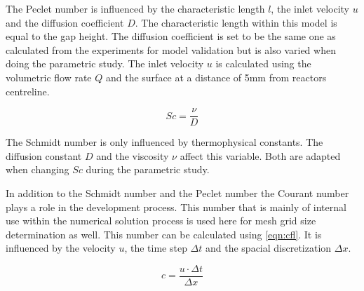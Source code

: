 \documentclass[../thesis.tex]{subfiles}
\begin{document}
The Peclet number is influenced by the characteristic length $l$, the inlet velocity $u$ and the diffusion coefficient $D$. The characteristic length within this model is equal to the gap height. The diffusion coefficient is set to be the same one as calculated from the experiments for model validation but is also varied when doing the parametric study. The inlet velocity $u$ is calculated using the volumetric flow rate $Q$ and the surface at a distance of 5mm from reactors centreline. 

\begin{equation}
	\label{eqn: Sc}
	Sc = \dfrac{\nu}{D}
\end{equation}

The Schmidt number is only influenced by thermophysical constants. The diffusion constant $D$ and the viscosity $\nu$ affect this variable. Both are adapted when changing $Sc$ during the parametric study.

In addition to the Schmidt number and the Peclet number the Courant number plays a role in the development process. This number that is mainly of internal use within the numerical solution process is used here for mesh grid size determination as well. This number can be calculated using \autoref{eqn:cfl}. It is influenced by the velocity $u$, the time step $ \Delta t$ and the spacial discretization $\Delta x$.

\begin{equation}
	\label{eqn:cfl}
	c = \dfrac{u \cdot \Delta t}{\Delta x}
\end{equation}
\end{document}
